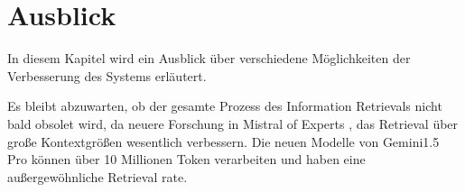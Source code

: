 \chapter{Ausblick}\label{ch:outlook}

In diesem Kapitel wird ein Ausblick über verschiedene Möglichkeiten der Verbesserung des Systems erläutert.

Es bleibt abzuwarten, ob der gesamte Prozess des Information Retrievals nicht bald obsolet wird, da neuere Forschung in Mistral of Experts \cite{jiang2024}, das Retrieval über große Kontextgrößen wesentlich verbessern.
Die neuen Modelle von Gemini1.5 Pro können über 10 Millionen Token verarbeiten und haben eine außergewöhnliche Retrieval rate.
